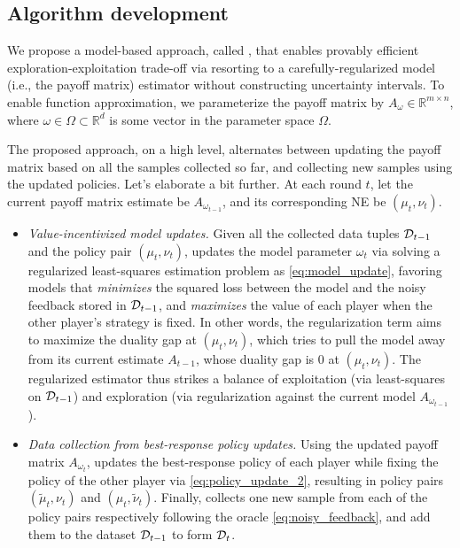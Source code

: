 \subsection{Algorithm development}\label{sec:matrix_alg}

We propose a model-based approach, called \name, that enables provably efficient exploration-exploitation trade-off via resorting to a carefully-regularized model (i.e., the payoff matrix) estimator without constructing uncertainty intervals. To enable function approximation, we parameterize the payoff matrix by $A_{\omega} \in \mathbb{R}^{m\times n}$,  where $\omega\in\Omega\subset\mathbb{R}^d$ is some vector in the parameter space $\Omega$. 

The proposed approach, on a high level, alternates between updating the payoff matrix based on all the samples collected so far, and collecting new samples using the updated  policies. Let's elaborate a bit further. At each round $t$, let  the current payoff matrix estimate be $A_{\omega_{t-1}}$, and its corresponding NE be $(\mu_t, \nu_t)$. 
\begin{itemize}
\item {\em Value-incentivized model updates.} Given all the collected data tuples ${\mathcal{D}}_{t-1}$ and the policy pair $(\mu_t, \nu_t)$, \name updates the model parameter $\omega_t$  via solving a regularized least-squares estimation problem as \eqref{eq:model_update}, favoring models that {\em minimizes} the squared loss between the model and the noisy feedback stored in ${\mathcal{D}}_{t-1}$, and {\em maximizes} the value of each player when the other player's strategy is fixed. In other words, the regularization term aims to maximize the duality gap at $(\mu_t, \nu_t)$, which tries to pull the model away from its current estimate $A_{t-1}$, whose duality gap is $0$ at $(\mu_t, \nu_t)$. The regularized estimator thus strikes a balance of exploitation (via least-squares on ${\mathcal{D}}_{t-1}$) and exploration (via regularization against the current model $A_{\omega_{t-1}}$).

\item {\em Data collection from best-response policy updates.} Using the updated payoff matrix $A_{\omega_t}$, \name updates the best-response policy of each player while fixing the policy of the other player via \eqref{eq:policy_update_2}, resulting in policy pairs $(\widetilde{\mu}_t,\nu_t)$ and $(\mu_t,\widetilde{\nu}_t)$. Finally, \name collects one new sample from each of the policy pairs respectively following the oracle \eqref{eq:noisy_feedback}, and add them to the dataset ${\mathcal{D}}_{t-1}$ to form ${\mathcal{D}}_t$. 

\end{itemize}
